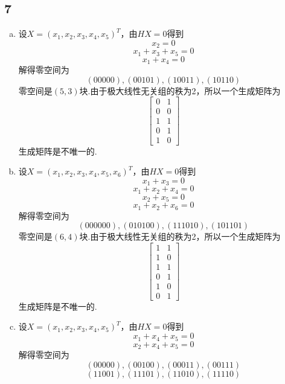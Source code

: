 \documentclass[twocolumn]{article}
\newenvironment{SChinese}{
	\CJKfamily{gbsn}
	\CJKtilde
	\CJKnospace}{}
\begin{document}
\begin{CJK}{UTF8}{}
\begin{SChinese}
			\subsection*{7}
				\begin{enumerate}[(a)]
					\item 设$X=(x_1,x_2,x_3,x_4,x_5)^T$，由$HX=0$得到\[x_2=0\]\[x_1+x_3+x_5=0\]
					\[x_1+x_4=0\]
					解得零空间为\begin{displaymath}
						(00000),(00101),(10011),(10110)
					\end{displaymath}
					零空间是$(5,3)$块.由于极大线性无关组的秩为2，所以一个生成矩阵为\begin{displaymath}
					\left [\begin{matrix}
					0 & 1 \\
					0 & 0 \\
					1 & 1 \\
					0 & 1 \\
					1 & 0
					\end{matrix}\right]
					\end{displaymath}
					生成矩阵是不唯一的.\\
					\item 设$X=(x_1,x_2,x_3,x_4,x_5,x_6)^T$，由$HX=0$得到
					\[x_1+x_3=0\]\[x_1+x_2+x_4=0\]\[x_2+x_5=0\]\[x_1+x_2+x_6=0\]
					解得零空间为\begin{displaymath}
						(000000),(010100),(111010),(101101)
					\end{displaymath}
					零空间是$(6,4)$块.由于极大线性无关组的秩为2，所以一个生成矩阵为\begin{displaymath}
					\left [\begin{matrix}
					1 & 1 \\
					1 & 0 \\
					1 & 1 \\
					0 & 1 \\
					1 & 0 \\
					0 & 1
					\end{matrix}\right]
					\end{displaymath}
					生成矩阵是不唯一的.\\
					\item 设$X=(x_1,x_2,x_3,x_4,x_5)^T$，由$HX=0$得到
					\[x_1+x_4+x_5=0\]\[x_2+x_4+x_5=0\]
					解得零空间为\begin{displaymath}
						(00000),(00100),(00011),(00111)
					\end{displaymath}
					\begin{displaymath}
						(11001),(11101),(11010),(11110)

\end{displaymath}
\end{enumerate}
\end{SChinese}
\end{CJK}
\end{document}

